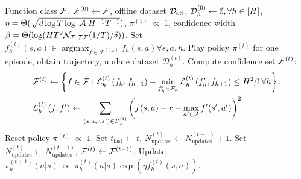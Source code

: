 \begin{algorithm}[t]
    \caption{}
    \begin{algorithmic}[1]
             Function class ${\mathcal{F}}$.
             ${\mathcal{F}}^{(0)} \leftarrow {\mathcal{F}}$, offline dataset ${\mathcal{D}}_{{\operatorname{off}}}$, ${\mathcal{D}}_h^{(0)}\leftarrow \emptyset, \forall h \in [H]$, $\eta = \Theta(\sqrt{d\log T \log|{\mathcal{A}}| H^{-1}T^{-1}})$, $\pi^{(1)} \; \propto \; 1$, confidence width $\beta=\Theta(\log (HT^2 \mathcal{N}_{{\mathcal{F}}, {\mathcal{T}} {\mathcal{F}}}(1/T) / \delta))$.
            \STATE Set $f_h^{(t)}(s,a) \in \operatorname{argmax}_{f \in \mathcal{F}^{(t_{\text{last}})}} f_h\left(s,a\right) \forall s,a,h$.
            \STATE Play policy $\pi^{(t)}$ for one episode, obtain trajectory, update dataset $\mathcal{D}_h^{(t)}$.  %
            \STATE Compute confidence set ${\mathcal{F}}^{(t)}$:
            \begingroup
            \addtolength\jot{-1ex}
            \begin{align*}
                &\mathcal{F}^{(t)} \leftarrow\left\{f \in \mathcal{F}: \mathcal{L}_h^{(t)}\left(f_h, f_{h+1}\right)-\min _{f_h^{\prime} \in \mathcal{F}_h} \mathcal{L}_h^{(t)}\left(f_h^{\prime}, f_{h+1}\right) \leq H^2\beta \; \forall h\right\},\\
                &\mathcal{L}_h^{(t)}\left(f, f'\right) \gets\sum_{\left(s, a, r, s^{\prime}\right) \in \mathcal{D}_h^{(t)}}\left(f(s, a)-r-\max_{a' \in {\mathcal{A}}}f^{\prime}(s^{\prime}, a')\right)^2.
            \end{align*}
            \endgroup
            \STATE Reset policy $\pi^{(t)} \; \propto \; 1$. 
            \STATE Set $t_{\text{last}} \gets t$, $N_{\text{updates}}^{(t)} \gets N_{\text{updates}}^{(t-1)}+ 1$.
            \ELSE
            \STATE Set $N_{\text{updates}}^{(t)} \gets N_{\text{updates}}^{(t-1)}$, ${\mathcal{F}}^{(t)} \gets {\mathcal{F}}^{(t-1)}$.
            \ENDIF
        \STATE Update $\pi_h^{(t+1)}(a|s) \; \propto \; \pi_h^{(t)}(a|s)\exp(\eta f_h^{(t)}(s,a))$.
        \ENDFOR
    \end{algorithmic}
\label{alg:NORA}
\end{algorithm}




